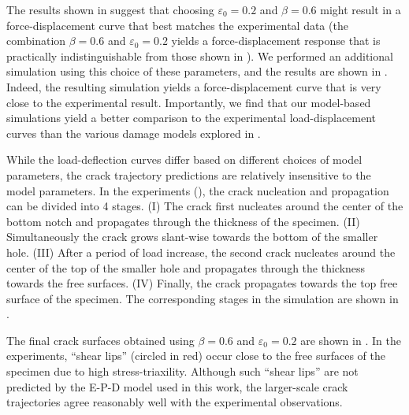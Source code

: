 The results shown in  suggest that choosing $\varepsilon_0=0.2$ and $\beta=0.6$ might result in a force-displacement curve that best matches the experimental data (the combination $\beta=0.6$ and $\varepsilon_0=0.2$ yields a force-displacement response that is practically indistinguishable from those shown in ).
We performed an additional simulation using this choice of these parameters, and the results are shown in . Indeed, the resulting simulation yields a force-displacement curve that is very close to the experimental result.   Importantly, we find that our model-based simulations yield a better comparison to the experimental load-displacement curves than the various damage models explored in \cite{kubik2019ductile}.



While the load-deflection curves differ based on different choices of model parameters, the crack trajectory predictions are relatively insensitive to the model parameters. In the experiments (), the crack nucleation and propagation can be divided into 4 stages. (I) The crack first nucleates around the center of the bottom notch and propagates through the thickness of the specimen. (II) Simultaneously the crack grows slant-wise towards the bottom of the smaller hole. (III) After a period of load increase, the second crack nucleates around the center of the top of the smaller hole and propagates through the thickness towards the free surfaces. (IV) Finally, the crack propagates towards the top free surface of the specimen.
The corresponding stages in the simulation are shown in .



The final crack surfaces obtained using $\beta = 0.6$ and $\varepsilon_0 = 0.2$ are shown in . In the experiments, ``shear lips'' (circled in red) occur close to the free surfaces of the specimen due to high stress-triaxility. Although such ``shear lips'' are not predicted by the E-P-D model used in this work, the larger-scale crack trajectories agree reasonably well with the experimental observations.

